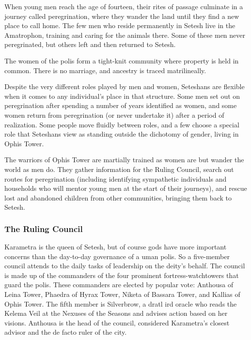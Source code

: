         When young men reach the age of fourteen, their rites of passage culminate in a journey called peregrination, where they wander the land until they find a new place to call home.
        The few men who reside permanently in Setesh live in the Amatrophon, training and caring for the animals there.
        Some of these men never peregrinated, but others left and then returned to Setesh.

        The women of the polis form a tight-knit community where property is held in common.
        There is no marriage, and ancestry is traced matrilineally.

        Despite the very different roles played by men and women, Seteshans are flexible when it comes to any individual's place in that structure.
        Some men set out on peregrination after spending a number of years identified as women, and some women return from peregrination (or never undertake it) after a period of realization.
        Some people move fluidly between roles, and a few choose a special role that Seteshans view as standing outside the dichotomy of gender, living in Ophis Tower.

        The warriors of Ophis Tower are martially trained as women are but wander the world as men do.
        They gather information for the Ruling Council, search out routes for peregrination (including identifying sympathetic individuals and households who will mentor young men at the start of their journeys), and rescue lost and abandoned children from other communities, bringing them back to Setesh.

    \subsubsection{The Ruling Council}
        Karametra is the queen of Setesh, but of course gods have more important concerns than the day-to-day governance of a uman polis.
        So a five-member council attends to the daily tasks of leadership on the deity's behalf.
        The council is made up of the commanders of the four prominent fortress-watchtowers that guard the polis.
        These commanders are elected by popular vote: Anthousa of Leina Tower, Phaedra of Hyrax Tower, Niketa of Bassara Tower, and Kallias of Ophis Tower.
        The fifth member is Silverbrow, a dratl ird oracle who reads the Kelema Veil at the Nexuses of the Seasons and advises action based on her visions.
        Anthousa is the head of the council, considered Karametra's closest advisor and the de facto ruler of the city.

